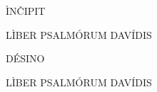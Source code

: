 \begin{center}
\vspace*{-1.0\baselineskip}

{\formatTextPsalmChapter ÌNČIPIT}

{\formatTextPsalmChapter LÌBER PSALMÓRUM DAVÍDIS}

\end{center}

\verseIndentOn
{}

\verseIndentOff

\begin{center}
\vfill

{\formatTextPsalmChapter DÉSINO}

{\formatTextPsalmChapter LÌBER PSALMÓRUM DAVÍDIS}

\vfill\vfill\vfill\vfill\vfill
\end{center}

\newpage






